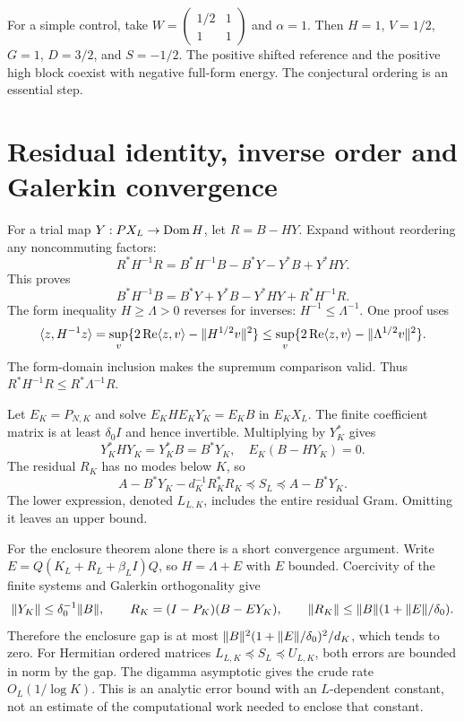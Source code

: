 For a simple control, take
$W=\left(\begin{smallmatrix}1/2&1\\1&1\end{smallmatrix}\right)$ and
$\alpha=1$. Then $H=1$, $V=1/2$, $G=1$, $D=3/2$, and $S=-1/2$.
The positive shifted reference and the positive high block coexist with
negative full-form energy. The conjectural ordering is an essential step.

\section{Residual identity, inverse order and Galerkin convergence}
For a trial map $Y:PX_L\to\operatorname{Dom} H$, let $R=B-HY$. Expand without
reordering any noncommuting factors:
\[
R^*H^{-1}R=B^*H^{-1}B-B^*Y-Y^*B+Y^*HY.
\]
This proves
\begin{equation}\label{d:residual}
B^*H^{-1}B=B^*Y+Y^*B-Y^*HY+R^*H^{-1}R.
\end{equation}
The form inequality $H\ge\Lambda>0$ reverses for inverses:
$H^{-1}\le\Lambda^{-1}$. One proof uses
\[
\langle z,H^{-1}z\rangle=\sup_v\{2\operatorname{Re}\langle z,v\rangle-\lVert H^{1/2}v\rVert^2\}
\le\sup_v\{2\operatorname{Re}\langle z,v\rangle-\lVert \Lambda^{1/2}v\rVert^2\}.
\]
The form-domain inclusion makes the supremum comparison valid.
Thus $R^*H^{-1}R\le R^*\Lambda^{-1}R$.

Let $E_K=P_{N,K}$ and solve $E_KHE_KY_K=E_KB$ in $E_KX_L$.
The finite coefficient matrix is at least $\delta_0I$ and hence invertible.
Multiplying by $Y_K^*$ gives
\[
Y_K^*HY_K=Y_K^*B=B^*Y_K,
\quad E_K(B-HY_K)=0.
\]
The residual $R_K$ has no modes below $K$, so
\begin{equation}\label{d:enclosures}
A-B^*Y_K-d_K^{-1}R_K^*R_K
\preceq S_L\preceq A-B^*Y_K.
\end{equation}
The lower expression, denoted $L_{L,K}$, includes the entire residual
Gram. Omitting it leaves an upper bound.

For the enclosure theorem alone there is a short convergence argument.
Write $E=Q(K_L+R_L+\beta_LI)Q$, so $H=\Lambda+E$ with $E$ bounded.
Coercivity of the finite systems and Galerkin orthogonality give
\[
\lVert Y_K\rVert\le\delta_0^{-1}\lVert B\rVert,\qquad
R_K=(I-P_K)(B-EY_K),\qquad
\lVert R_K\rVert\le\lVert B\rVert(1+\lVert E\rVert/\delta_0).
\]
Therefore the enclosure gap is at most
$\lVert B\rVert^2(1+\lVert E\rVert/\delta_0)^2/d_K$, which tends to zero.
For Hermitian ordered matrices $L_{L,K}\preceq S_L\preceq U_{L,K}$,
both errors are bounded in norm by the gap.
The digamma asymptotic gives the crude rate $O_L(1/\log K)$.
This is an analytic error bound with an $L$-dependent constant, not an
estimate of the computational work needed to enclose that constant.

